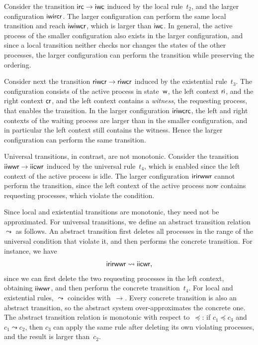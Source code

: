 Consider the transition $\mathsf{i}\mathsf{r}\mathsf{c} \to \mathsf{i}\mathsf{w}\mathsf{c}$ induced by the
local rule~$t_2$, and the larger configuration $\mathsf{i}\mathsf{w}\mathsf{i}\mathsf{r}\mathsf{c}\mathsf{r}$.
The larger configuration can perform the same local transition and reach
$\mathsf{i}\mathsf{w}\mathsf{i}\mathsf{w}\mathsf{c}\mathsf{r}$, which is larger than $\mathsf{i}\mathsf{w}\mathsf{c}$. In
general, the active process of the smaller configuration also exists in the
larger configuration, and since a local transition neither checks nor changes
the states of the other processes, the larger configuration can perform the
transition while preserving the ordering.

Consider next the transition $\mathsf{r}\mathsf{i}\mathsf{w}\mathsf{c}\mathsf{r} \to
\mathsf{r}\mathsf{i}\mathsf{w}\mathsf{c}\mathsf{r}$ induced by the existential rule~$t_3$. The
configuration consists of the active process in state~$\mathsf{w}$, the left
context $\mathsf{r}\mathsf{i}$, and the right context $\mathsf{c}\mathsf{r}$, and the left context
contains a \emph{witness}, the requesting process, that enables the transition.
In the larger configuration $\mathsf{i}\mathsf{r}\mathsf{i}\mathsf{w}\mathsf{c}\mathsf{r}\mathsf{c}$, the left and
right contexts of the waiting process are larger than in the smaller
configuration, and in particular the left context still contains the witness.
Hence the larger configuration can perform the same transition.

Universal transitions, in contrast, are not monotonic. Consider the transition
$\mathsf{i}\mathsf{i}\mathsf{w}\mathsf{w}\mathsf{r} \to \mathsf{i}\mathsf{i}\mathsf{c}\mathsf{w}\mathsf{r}$ induced by the
universal rule~$t_4$, which is enabled since the left context of the active
process is idle. The larger configuration $\mathsf{i}\mathsf{r}\mathsf{i}\mathsf{r}\mathsf{w}\mathsf{w}\mathsf{r}$
cannot perform the transition, since the left context of the active process
now contains requesting processes, which violate the condition.

Since local and existential transitions are monotonic, they need not be
approximated. For universal transitions, we define an abstract transition
relation~$\leadsto$ as follows. An abstract transition first deletes all
processes in the range of the universal condition that violate it, and then
performs the concrete transition. For instance, we have
\[
\mathsf{i}\mathsf{r}\mathsf{i}\mathsf{r}\mathsf{w}\mathsf{w}\mathsf{r} \leadsto \mathsf{i}\mathsf{i}\mathsf{c}\mathsf{w}\mathsf{r} ,
\]
since we can first delete the two requesting processes in the left context,
obtaining $\mathsf{i}\mathsf{i}\mathsf{w}\mathsf{w}\mathsf{r}$, and then perform the concrete
transition~$t_4$. For local and existential rules, $\leadsto$ coincides
with~$\to$. Every concrete transition is also an abstract transition, so the
abstract system over-approximates the concrete one. The abstract transition
relation is monotonic with respect to~$\preceq$: if $c_1 \preceq c_3$ and $c_1
\leadsto c_2$, then $c_3$ can apply the same rule after deleting its own
violating processes, and the result is larger than~$c_2$.

